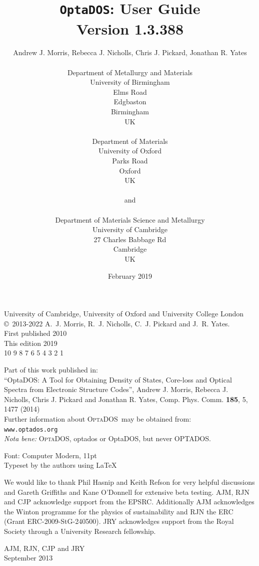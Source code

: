 \documentclass[a4paper,11pt,twoside]{book}
\title{{\huge {\tt OptaDOS}: User Guide}\\ {Version 1.3.388}}
\author{Andrew J. Morris, Rebecca J. Nicholls, Chris J. Pickard, Jonathan R. Yates \\
\\
Department of Metallurgy and Materials\\
University of Birmingham \\
Elms Road\\
Edgbaston\\
Birmingham\\
UK\\
\\
Department of Materials\\
University of Oxford\\
Parks Road\\
Oxford\\
UK \\
\\
{\small and} \\
\\
Department of Materials Science and Metallurgy\\
University of Cambridge\\
27 Charles Babbage Rd\\
Cambridge\\
UK\\
}
\date{February 2019}
\begin{document}
\newcommand{\optados}{\textsc{OptaDOS}}
\newcommand{\lindos}{\texttt{LinDOS}}
\newcommand{\onetep}{\textsc{onetep}}
\newcommand{\castep}{\textsc{castep}}
\newcommand{\python}{\textsc{Python}}
\maketitle

 \thispagestyle{empty}

\begin{centering}
\vspace*{40mm}
University of Cambridge, University of Oxford and University College London\\
\vspace{5mm}
\copyright\ 2013-2022 A.~J. Morris, R.~J. Nicholls, C.~J. Pickard and J.~R. Yates.\\
\vspace{5mm}
First published 2010\\
This edition 2019\\
\vspace{5mm}
10 9 8 7 6 5 4 3 2 1
\vspace{5mm}

Part of this work published in:\\
``OptaDOS: A Tool for Obtaining Density of States, Core-loss and Optical Spectra from Electronic Structure Codes'', Andrew J. Morris, Rebecca J. Nicholls, Chris J. Pickard and Jonathan R. Yates, Comp. Phys. Comm. {\bf 185}, 5, 1477 (2014)\\
\vspace{10mm}
Further information about \optados\ may be obtained from:\\ \texttt{www.optados.org}\\

\vspace{10mm}
\emph{Nota bene:} \optados, optados or OptaDOS, but never OPTADOS.

\null\vfill
\noindent
Font: Computer Modern, 11pt\\
Typeset by the authors using \LaTeX\, \\
\end{centering}
\newpage

\setcounter{tocdepth}{1}
\tableofcontents

\newpage
 \thispagestyle{empty}
\vspace*{50mm}
\begin{centering}
We would like to thank Phil Hasnip and Keith Refson for very helpful discussions and Gareth Griffiths and Kane O'Donnell for extensive beta testing.
 AJM, RJN and CJP acknowledge support from the EPSRC. Additionally AJM acknowledges
the Winton programme for the physics of sustainability and RJN the ERC
(Grant ERC-2009-StG-240500).
 JRY acknowledges support from the Royal Society through a University Research fellowship.
\end{centering}
\begin{flushright}
AJM, RJN, CJP and JRY\\
September 2013
\end{flushright}
\end{document}
